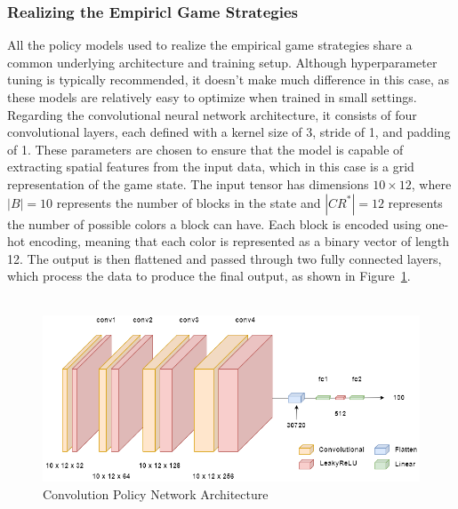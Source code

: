 \begin{flushleft}
\begin{flushleft}
    \end{flushleft}

    \subsubsection{Realizing the Empiricl Game Strategies}

    \begin{flushleft}

        All the policy models used to realize the empirical game strategies share a common underlying architecture and training setup. Although hyperparameter tuning is typically recommended, it doesn't make much difference in this case, as these models are relatively easy to optimize when trained in small settings. Regarding the convolutional neural network architecture, it consists of four convolutional layers, each defined with a kernel size of 3, stride of 1, and padding of 1. These parameters are chosen to ensure that the model is capable of extracting spatial features from the input data, which in this case is a grid representation of the game state. The input tensor has dimensions $10 \times 12$, where $|B|=10$ represents the number of blocks in the state and $|CR^*|=12$ represents the number of possible colors a block can have. Each block is encoded using one-hot encoding, meaning that each color is represented as a binary vector of length 12. The output is then flattened and passed through two fully connected layers, which process the data to produce the final output, as shown in Figure~\ref{fig:convDQN}.\\~\\
        \begin{figure}[H]
            \centering
            \includegraphics[width=0.8\linewidth]{images/convDQN.png}
            \caption{Convolution Policy Network Architecture}
            \label{fig:convDQN}
        \end{figure}


\end{flushleft}
\end{flushleft}
